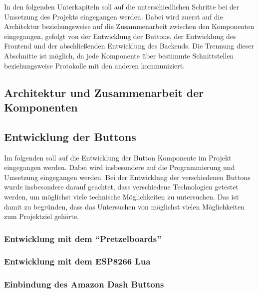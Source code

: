 In den folgenden Unterkapiteln soll auf die unterschiedlichen Schritte bei der Umsetzung des Projekts eingegangen werden. Dabei wird zuerst auf die Architektur beziehungsweise auf die Zusammenarbeit zwischen den Komponenten eingegangen, gefolgt von der Entwicklung der Buttons, der Entwicklung des Frontend und der abschließenden Entwicklung des Backends. Die Trennung dieser Abschnitte ist möglich, da jede Komponente über bestimmte Schnittstellen beziehungsweise Protokolle mit den anderen kommuniziert. 

\subsection{Architektur und Zusammenarbeit der Komponenten}        
\label{sec:Architektur und Zusammenarbeit der Komponenten-1} 



\newpage

\subsection{Entwicklung der Buttons}  
\label{sec:Entwicklung der Buttons-1} 

Im folgenden soll auf die Entwicklung der Button Komponente im Projekt eingegangen werden. Dabei wird insbesondere auf die Programmierung und Umsetzung eingegangen werden. 
Bei der Entwicklung der verschiedenen Buttons wurde insbesondere darauf geachtet, dass verschiedene Technologien getestet werden, um möglichst viele technische Möglichkeiten zu untersuchen. Das ist damit zu begründen, dass das Untersuchen von möglichst vielen Möglichkeiten zum Projektziel gehörte. 

\subsubsection{Entwicklung mit dem ``Pretzelboards''}  
\label{sec:Entwicklung mit dem ``Pretzelboards''-1}


\subsubsection{Entwicklung mit dem ESP8266 Lua}  
\label{sec:Entwicklung mit dem ESP8266-1}


\subsubsection{Einbindung des Amazon Dash Buttons}  
\label{sec:Einbindung des Amazon Dash Buttons-1}


